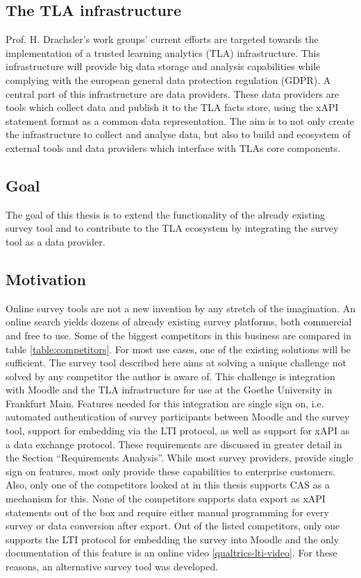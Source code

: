 \subsection{The TLA infrastructure}
    Prof. H. Drachsler's work groups' current efforts are targeted towards the implementation
    of a trusted learning analytics (TLA) infrastructure. This infrastructure will
    provide big data storage and analysis capabilities while complying with the european general
    data protection regulation (GDPR). A central part of this infrastructure are data
    providers. These data providers are tools which collect data and publish it to
    the TLA facts store, using the xAPI statement format as a common data representation.
    The aim is to not only create the infrastructure to collect and analyse data,
    but also to build and ecosystem of external tools and data providers
    which interface with TLAs core components.

\subsection{Goal}
    The goal of this thesis is to extend the functionality of the already existing
    survey tool and to contribute to the TLA ecosystem by integrating the
    survey tool as a data provider.

\subsection{Motivation}
    Online survey tools are not a new invention by any stretch of the imagination.
    An online search yields dozens of already existing survey platforms, both
    commercial and free to use. Some of the biggest competitors in this business
    are compared in table \ref{table:competitors}. For most use cases, one
    of the existing solutions will be sufficient. The survey tool described here
    aims at solving a unique challenge not solved by any competitor the author
    is aware of. This challenge is integration with Moodle and the TLA
    infrastructure for use at the Goethe University in Frankfurt Main.
    Features needed for this integration are single sign on, i.e.
    automated authentication of survey participants between Moodle and
    the survey tool, support for embedding via the LTI protocol, 
    as well as support for xAPI as a data exchange protocol.
    These requirements are discussed in greater detail in the Section
    ``Requirements Analysis''. While most survey providers, provide single
    sign on features, most only provide these capabilities to enterprise
    customers. Also, only one of the competitors looked at in this thesis
    supports CAS as a mechanism for this. None of the competitors
    supports data export as xAPI statements out of the box and require either
    manual programming for every survey or data conversion after export. 
    Out of the listed competitors, only one supports the LTI protocol for
    embedding the survey into Moodle and the only documentation of this 
    feature is an online video \ref{qualtrics-lti-video}. For these
    reasons, an alternative survey tool was developed.

